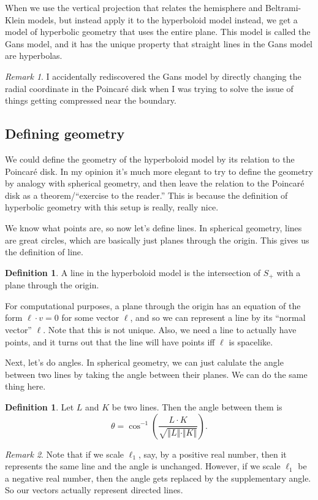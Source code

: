 \documentclass{article}
\theoremstyle{definition}
\newtheorem{defn}[thm]{Definition}
\theoremstyle{remark}
\newtheorem*{rmk}{Remark}
\begin{document}
When we use the vertical projection that relates the hemisphere and Beltrami-Klein models, but instead apply it to the hyperboloid model instead, we get a model of hyperbolic geometry that uses the entire plane. This model is called the Gans model, and it has the unique property that straight lines in the Gans model are hyperbolas. 

\begin{rmk}
    I accidentally rediscovered the Gans model by directly changing the radial coordinate in the Poincar\'e disk when I was trying to solve the issue of things getting compressed near the boundary.
\end{rmk}

\subsection{Defining geometry}
We could define the geometry of the hyperboloid model by its relation to the Poincar\'e disk. In my opinion it's much more elegant to try to define the geometry by analogy with spherical geometry, and then leave the relation to the Poincar\'e disk as a theorem/``exercise to the reader.'' This is because the definition of hyperbolic geometry with this setup is really, really nice.

We know what points are, so now let's define lines. In spherical geometry, lines are great circles, which are basically just planes through the origin. This gives us the definition of line.
\begin{defn}
    A line in the hyperboloid model is the intersection of $S_+$ with a plane through the origin.
\end{defn}
For computational purposes, a plane through the origin has an equation of the form $\ell\cdot v=0$ for some vector $\ell$, and so we can represent a line by its ``normal vector'' $\ell$. Note that this is not unique. Also, we need a line to actually have points, and it turns out that the line will have points iff $\ell$ is spacelike.

Next, let's do angles. In spherical geometry, we can just calulate the angle between two lines by taking the angle between their planes. We can do the same thing here.
\begin{defn}
    Let $L$ and $K$ be two lines. Then the angle between them is
    \[\theta=\cos^{-1}\left(\frac{L\cdot K}{\sqrt{\Vert L\Vert\cdot\Vert K\Vert}}\right).\]
\end{defn}
\begin{rmk}
    Note that if we scale $\ell_1$, say, by a positive real number, then it represents the same line and the angle is unchanged. However, if we scale $\ell_1$ be a negative real number, then the angle gets replaced by the supplementary angle. So our vectors actually represent directed lines.
\end{rmk}
\end{document}
